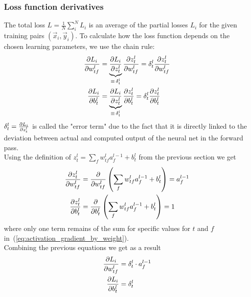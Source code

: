 \subsubsection*{Loss function derivatives}

The total loss $L = \frac{1}{N}\sum\limits_i^{N}{L_i}$ is an average of the partial losses
$L_i$ for the given training pairs $(\vec{x}_i, \vec{y}_i)$. To calculate how the loss
function depends on the chosen learning parameters, we use the chain rule:
\begin{subequations}
    \begin{align}
        \frac{\partial {L_i}}{\partial {w_{tf}^l}} & =
        \underbrace{\frac{\partial {L_i}}{\partial {z_t^l}}}_{\equiv\,\delta_t^l} \frac{\partial {z_t^l}}{\partial {w_{tf}^l}}
        = \delta_t^l \frac{\partial {z_t^l}}{\partial {w_{tf}^l}}
        \label{eq:loss_gradient_by_weight} \\
        \frac{\partial {L_i}}{\partial {b_t^l}} & =
        \underbrace{\frac{\partial {L_i}}{\partial {z_t^l}}}_{\equiv\,\delta_t^l} \frac{\partial {z_t^l}}{\partial {b_t^l}}
        = \delta_t^l \frac{\partial {z_t^l}}{\partial {b_t^l}}
        \label{eq:loss_gradient_by_bias}  
    \end{align}
\end{subequations}
$\delta_t^l = \frac{\partial {L_i}}{\partial {z_t^l}}$ is called the "error term" due to the fact that it is
directly linked to the deviation between actual and computed output of the neural net in
the forward pass. \\

Using the definition of $z_t^l = \sum_{f}{w^l_{tf} a^{l-1}_f} + b^l_t$
from the previous section we get
\begin{subequations}
    \begin{align}
    \frac{\partial {z_t^l}}{\partial {w^l_{tf}}} & =\frac{\partial {}}{\partial {w^l_{tf}}}\left(
        \sum\limits_{f}{w^l_{tf} a^{l-1}_f} + b^l_t
        \right) = a^{l-1}_f \label{eq:activation_gradient_by_weight} \\
    \frac{\partial {z_t^l}}{\partial {b^l_t}} & =\frac{\partial {}}{\partial {b^l_t}}\left(
        \sum\limits_{f}{w^l_{tf} a^{l-1}_f} + b^l_t
        \right) = 1 \label{eq:activation_gradient_by_bias}
\end{align}
\end{subequations}
where only one term remains of the sum for specific values for $t$ and $f$
in~(\ref{eq:activation_gradient_by_weight}). \\

Combining the previous equations we get as a result
\begin{subequations}
    \begin{align}
        \frac{\partial {L_i}}{\partial {w_{tf}^l}} & = \delta_t^l \cdot a^{l-1}_f
        \label{eq:loss_gradient_by_weight_condensed}\\
        \frac{\partial {L_i}}{\partial {b^l_t}} & = \delta_t^l
        \label{eq:loss_gradient_by_bias_condensed}
    \end{align}
\end{subequations}

